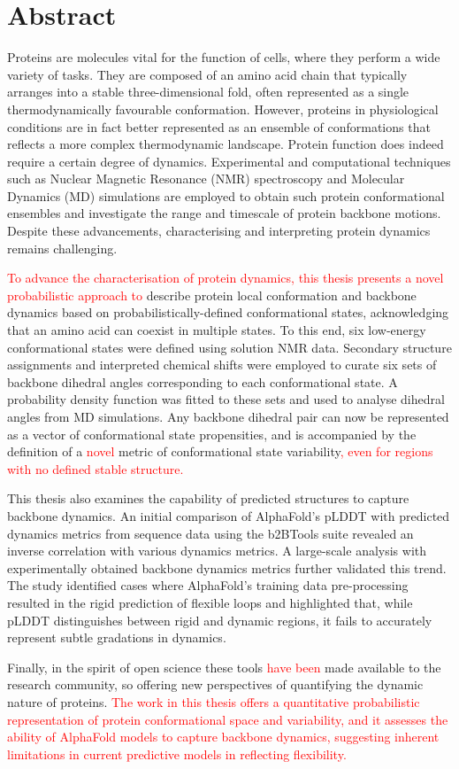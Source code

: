 \chapter*{Abstract}

Proteins are molecules vital for the function of cells, where they perform a wide variety of tasks. They are composed of an amino acid chain that typically arranges into a stable three-dimensional fold, often represented as a single thermodynamically favourable conformation. However, proteins in physiological conditions are in fact better represented as an ensemble of conformations that reflects a more complex thermodynamic landscape. Protein function does indeed require a certain degree of dynamics. Experimental and computational techniques such as Nuclear Magnetic Resonance (NMR) spectroscopy and Molecular Dynamics (MD) simulations are employed to obtain such protein conformational ensembles and investigate the range and timescale of protein backbone motions. Despite these advancements, characterising and interpreting protein dynamics remains challenging.

\textcolor{red}{To advance the characterisation of protein dynamics, this thesis presents a novel probabilistic approach to} describe protein local conformation and backbone dynamics based on probabilistically-defined conformational states, acknowledging that an amino acid can coexist in multiple states. To this end, six low-energy conformational states were defined using solution NMR data. Secondary structure assignments and interpreted chemical shifts were employed to curate six sets of backbone dihedral angles corresponding to each conformational state. A probability density function was fitted to these sets and used to analyse dihedral angles from MD simulations. Any backbone dihedral pair can now be represented as a vector of conformational state propensities, and is accompanied by the definition of a \textcolor{red}{novel} metric of conformational state variability\textcolor{red}{, even for regions with no defined stable structure.}

This thesis also examines the capability of predicted structures to capture backbone dynamics. An initial comparison of AlphaFold's pLDDT with predicted dynamics metrics from sequence data using the b2BTools suite revealed an inverse correlation with various dynamics metrics. A large-scale analysis with experimentally obtained backbone dynamics metrics further validated this trend. The study identified cases where AlphaFold’s training data pre-processing resulted in the rigid prediction of flexible loops and highlighted that, while pLDDT distinguishes between rigid and dynamic regions, it fails to accurately represent subtle gradations in dynamics.

Finally, in the spirit of open science these tools \textcolor{red}{have been} made available to the research community, so offering new perspectives of quantifying the dynamic nature of proteins. \textcolor{red}{The work in this thesis offers a quantitative probabilistic representation of protein conformational space and variability, and it assesses the ability of AlphaFold models to capture backbone dynamics, suggesting inherent limitations in current predictive models in reflecting flexibility.}